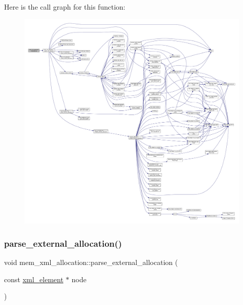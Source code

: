 Here is the call graph for this function\+:
\nopagebreak
\begin{figure}[H]
\begin{center}
\leavevmode
\includegraphics[width=350pt]{d2/d51/classmem__xml__allocation_ab52f147c4c950b89428a1c6ad515a7a3_cgraph}
\end{center}
\end{figure}
\mbox{\label{classmem__xml__allocation_a07bd3a79034972bb53511ab5d17f00e6}} 
\subsubsection{\texorpdfstring{parse\+\_\+external\+\_\+allocation()}{parse\_external\_allocation()}}
{\footnotesize\ttfamily void mem\+\_\+xml\+\_\+allocation\+::parse\+\_\+external\+\_\+allocation (\begin{DoxyParamCaption}\item[{const \hyperlink{classxml__element}{xml\+\_\+element} $\ast$}]{node }\end{DoxyParamCaption})\hspace{0.3cm}{\ttfamily [private]}}



